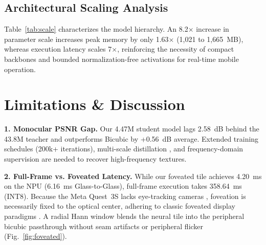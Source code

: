 \documentclass[conference]{IEEEtran}
\begin{document}
\subsection{Architectural Scaling Analysis}
\begin{table}[!b]
\centering
\caption{Architectural Scaling Hierarchy on Mobile Hardware.}\label{tab:scale}
\end{table}
Table~\ref{tab:scale} characterizes the model hierarchy. An 8.2$\times$ increase in parameter scale increases peak memory by only 1.63$\times$ (1{,}021 to 1{,}665~MB), whereas execution latency scales 7$\times$, reinforcing the necessity of compact backbones \cite{convnext, mobilenetv3, nafnet, repvgg} and bounded normalization-free activations \cite{dyt, nfnet} for real-time mobile operation.

\section{Limitations \& Discussion}
\textbf{1. Monocular PSNR Gap.} Our 4.47M student model lags 2.58~dB behind the 43.8M teacher \cite{stereoinr} and outperforms Bicubic by +0.56~dB average. Extended training schedules (200k+ iterations), multi-scale distillation \cite{kd}, and frequency-domain supervision \cite{ffl} are needed to recover high-frequency textures.

\textbf{2. Full-Frame vs. Foveated Latency.} While our foveated tile achieves 4.20~ms on the NPU (6.16~ms Glass-to-Glass), full-frame execution takes 358.64~ms (INT8). Because the Meta Quest~3S lacks eye-tracking cameras \cite{quest3_optics}, foveation is necessarily fixed to the optical center, adhering to classic foveated display paradigms \cite{foveated_rendering, patney_foveated}. A radial Hann window blends the neural tile into the peripheral bicubic passthrough without seam artifacts or peripheral flicker \cite{patney_foveated} (Fig.~\ref{fig:foveated}).
\end{document}
